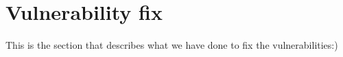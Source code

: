 \section{Vulnerability fix}

This is the section that describes what we have done to fix the vulnerabilities:)